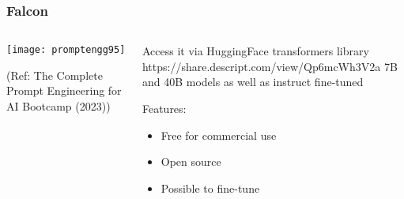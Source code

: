 






\begin{frame}[fragile]\frametitle{Falcon}


\begin{columns}
    \begin{column}[T]{0.6\linewidth}
		\begin{center}
		\texttt{[image: promptengg95]}

		{\tiny (Ref: The Complete Prompt Engineering for AI Bootcamp (2023))}
		\end{center}	
    \end{column}
    \begin{column}[T]{0.4\linewidth}
		Access it via HuggingFace transformers library https://share.descript.com/view/Qp6mcWh3V2a
		7B and 40B models as well as instruct fine-tuned
		
		Features:
		\begin{itemize}
		\item Free for commercial use
		\item Open source
		\item Possible to fine-tune
		\end{itemize}	 

    \end{column}
  \end{columns}
\end{frame}





